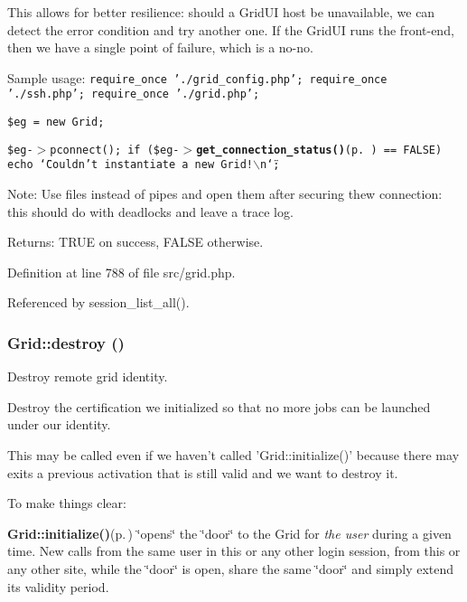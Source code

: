 This allows for better resilience: should a Grid\-UI host be unavailable, we can detect the error condition and try another one. If the Grid\-UI runs the front-end, then we have a single point of failure, which is a no-no.

Sample usage: {\tt  require\_\-once './grid\_\-config.php'; require\_\-once './ssh.php'; require\_\-once './grid.php';}

{\tt  \$eg = new Grid;}

{\tt  \$eg-$>$pconnect(); if (\$eg-$>${\bf get\_\-connection\_\-status()}{\rm (p.\,\pageref{classGrid_a8})} == FALSE) echo \char`\"{}Couldn't instantiate a new Grid!$\backslash$n\char`\"{}; }

\begin{Desc}
\item[Note:]Use files instead of pipes and open them after securing thew connection: this should do with deadlocks and leave a trace log.\end{Desc}
\begin{Desc}
\item[Returns:]TRUE on success, FALSE otherwise. \end{Desc}


Definition at line 788 of file src/grid.php.

Referenced by session\_\-list\_\-all().
\subsubsection{\setlength{\rightskip}{0pt plus 5cm}Grid::destroy ()}\label{classGrid_a38}


Destroy remote grid identity. 

Destroy the certification we initialized so that no more jobs can be launched under our identity.

This may be called even if we haven't called 'Grid::initialize()' because there may exits a previous activation that is still valid and we want to destroy it.

To make things clear:

{\bf Grid::initialize()}{\rm (p.\,\pageref{classGrid_a11})} \char`\"{}opens\char`\"{} the \char`\"{}door\char`\"{} to the Grid for {\em the user\/} during a given time. New calls from the same user in this or any other login session, from this or any other site, while the \char`\"{}door\char`\"{} is open, share the same \char`\"{}door\char`\"{} and simply extend its validity period.

